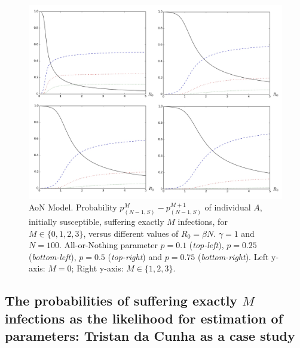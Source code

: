 \documentclass[preprint,12pt]{elsarticle}
\begin{document}
\begin{figure}[h!]
  \centering
 \includegraphics[width=\textwidth]{AoN.jpg}
 \caption{AoN Model. Probability $p_{(N-1,S)}^M-p_{(N-1,S)}^{M+1}$ of individual $A$, initially susceptible, suffering exactly $M$ infections, for $M\in\{0,1,2,3\}$, versus different values of $R_0=\beta N$. $\gamma=1$ and $N=100$.
All-or-Nothing parameter $p=0.1$ ({\it top-left}), $p=0.25$ ({\it bottom-left}), $p=0.5$ ({\it top-right}) and
$p=0.75$ ({\it bottom-right}). Left y-axis: $M=0$; Right y-axis: $M\in\{1,2,3\}$.}
 \label{fig:aon}
\end{figure}

\subsection{The probabilities of suffering exactly $M$ infections as the likelihood for estimation of parameters: Tristan da Cunha as a case study}
\label{SubSect32}
\end{document}
